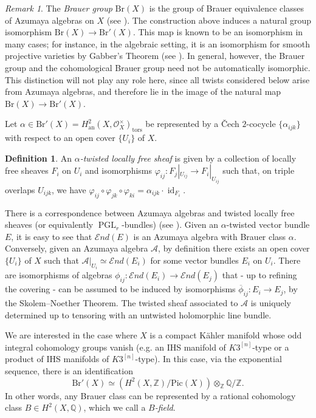 \documentclass[12pt,a4paper]{amsart}
\theoremstyle{plain}
\theoremstyle{definition}
\newtheorem{df}[thm]{Definition}
\theoremstyle{remark}
\newtheorem{rmk}[thm]{Remark}
\def\Pic{\mathrm{Pic}}
\def\H{H}
\def\PGL{\operatorname{PGL}}
\newcommand{\Br}{\mathrm{Br}}
\begin{document}
\begin{rmk}
The \emph{Brauer group} $\Br(X)$ is the group of Brauer equivalence classes of Azumaya algebras on $X$ (see \cite{schroer-analytic-brauer}). The construction above induces a natural group isomorphism $\Br(X)\longrightarrow \Br'(X)$. This map is known to be an isomorphism in many cases; for instance, in the algebraic setting, it is an isomorphism for smooth projective varieties by Gabber's Theorem (see \cite{dejong-gabber}). In general, however, the Brauer group and the cohomological Brauer group need not be automatically isomorphic. This distinction will not play any role here, since all twists considered below arise from Azumaya algebras, and therefore lie in the image of the natural map $\Br(X)\longrightarrow \Br'(X)$.
\end{rmk}
Let $\alpha\in\Br'(X)=\H^2_{\mathrm{an}}(X,\mathcal{O}_X^\times)_{\mathrm{tors}}$ be represented by a \v{C}ech $2$-cocycle $\{\alpha_{ijk}\}$ with respect to an open cover $\{U_i\}$ of $X$.

\begin{df}
An \emph{$\alpha$-twisted locally free sheaf} is given by a collection of locally free sheaves $F_i$ on $U_i$ and isomorphisms $\varphi_{ij}\colon F_j|_{U_{ij}}\longrightarrow F_i|_{U_{ij}}$ such that, on triple overlaps $U_{ijk}$, we have $\varphi_{ij}\circ\varphi_{jk}\circ\varphi_{ki}=\alpha_{ijk}\cdot\operatorname{id}_{F_i}$.
\end{df}

There is a correspondence between Azumaya algebras and twisted locally free sheaves (or equivalently $\PGL_r$-bundles) (see \cite{huybrechts-schroeer-brauer}). Given an $\alpha$-twisted vector bundle $E$, it is easy to see that $\mathcal{E}nd(E)$ is an Azumaya algebra with Brauer class $\alpha$. Conversely, given an Azumaya algebra $\mathcal{A}$, by definition there exists an open cover $\{U_i\}$ of $X$ such that $\mathcal{A}|_{U_i} \simeq \mathcal{E}nd(E_i)$ for some vector bundles $E_i$ on $U_i$. There are isomorphisms of algebras $\phi_{ij}:\mathcal{E}nd(E_i)\rightarrow\mathcal{E}nd(E_j)$ that - up to refining the covering - can be assumed to be induced by isomorphisms $\overline{\phi}_{ij}\colon E_i\rightarrow E_j$, by the Skolem--Noether Theorem. The twisted sheaf associated to $\mathcal{A}$ is uniquely determined up to tensoring with an untwisted holomorphic line bundle.


We are interested in the case where $X$ is a compact K\"ahler manifold whose odd integral cohomology groups vanish (e.g. an IHS manifold of $K3^{[n]}$-type or a product of IHS manifolds of $K3^{[n]}$-type). In this case, via the exponential sequence, there is an identification $$\Br'(X)\simeq (\H^2(X,\mathbb{Z})/\Pic(X))\otimes_{\mathbb{Z}}\mathbb{Q}/\mathbb{Z}.$$ In other words, any Brauer class can be represented by a rational cohomology class $B\in \H^2(X,\mathbb{Q})$, which we call a \emph{$B$-field}.
\end{document}
